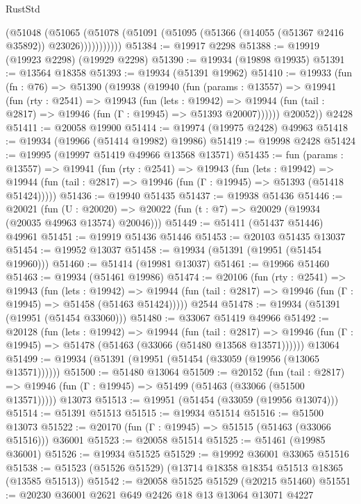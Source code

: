 \begin{lexlean}{RustStd}
\begin{coremodule}
              (@51048
                (@51065
                  (@51078 (@51091 (@51095 (@51366 (@14055 (@51367 @2416 @35892)) @23026)))))))))))
@51384 := @19917 @2298
@51388 := @19919 (@19923 @2298) (@19929 @2298)
@51390 := @19934 (@19898 @19935)
@51391 := @13564 @18358
@51393 := @19934 (@51391 @19962)
@51410 := @19933
    (fun (fn : @76) =>
    @51390
      (@19938
        (@19940
          (fun (params : @13557) =>
          @19941
            (fun (rty : @2541) =>
            @19943
              (fun (lets : @19942) =>
              @19944 (fun (tail : @2817) => @19946 (fun (Γ : @19945) => @51393 @20007))))))
        @20052))
    @2428
@51411 := @20058 @19900
@51414 := @19974 (@19975 @2428) @49963
@51418 := @19934 (@19966 (@51414 @19982) @19986)
@51419 := @19998 @2428
@51424 := @19995 (@19997 @51419 @49966 @13568 @13571)
@51435 := fun (params : @13557) =>
  @19941
    (fun (rty : @2541) =>
    @19943
      (fun (lets : @19942) =>
      @19944 (fun (tail : @2817) => @19946 (fun (Γ : @19945) => @51393 (@51418 @51424)))))
@51436 := @19940 @51435
@51437 := @19938 @51436
@51446 := @20021
    (fun (U : @20020) => @20022 (fun (t : @7) => @20029 (@19934 (@20035 @49963 @13574) @20046)))
@51449 := @51411 (@51437 @51446) @49961
@51451 := @19919 @51436 @51446
@51453 := @20103 @51435 @13037
@51454 := @19952 @13037
@51458 := @19934 (@51391 (@19951 (@51454 @19960)))
@51460 := @51414 (@19981 @13037)
@51461 := @19966 @51460
@51463 := @19934 (@51461 @19986)
@51474 := @20106
    (fun (rty : @2541) =>
    @19943
      (fun (lets : @19942) =>
      @19944 (fun (tail : @2817) => @19946 (fun (Γ : @19945) => @51458 (@51463 @51424)))))
    @2544
@51478 := @19934 (@51391 (@19951 (@51454 @33060)))
@51480 := @33067 @51419 @49966
@51492 := @20128
    (fun (lets : @19942) =>
    @19944
      (fun (tail : @2817) =>
      @19946 (fun (Γ : @19945) => @51478 (@51463 (@33066 (@51480 @13568 @13571))))))
    @13064
@51499 := @19934 (@51391 (@19951 (@51454 (@33059 (@19956 (@13065 @13571))))))
@51500 := @51480 @13064
@51509 := @20152
    (fun (tail : @2817) => @19946 (fun (Γ : @19945) => @51499 (@51463 (@33066 (@51500 @13571)))))
    @13073
@51513 := @19951 (@51454 (@33059 (@19956 @13074)))
@51514 := @51391 @51513
@51515 := @19934 @51514
@51516 := @51500 @13073
@51522 := @20170 (fun (Γ : @19945) => @51515 (@51463 (@33066 @51516))) @36001
@51523 := @20058 @51514
@51525 := @51461 (@19985 @36001)
@51526 := @19934 @51525
@51529 := @19992 @36001 @33065 @51516
@51538 := @51523 (@51526 @51529) (@13714 @18358 @18354 @51513 @18365 (@13585 @51513))
@51542 := @20058 @51525 @51529 (@20215 @51460)
@51551 := @20230 @36001 @2621 @649 @2426 @18 @13 @13064 @13071 @4227

\end{coremodule}
\end{lexlean}
